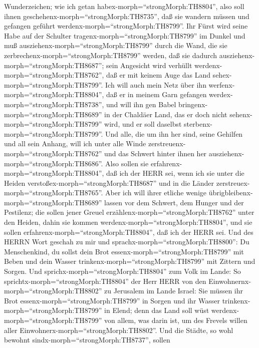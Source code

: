 Wunderzeichen; wie ich getan habex-morph=``strongMorph:TH8804'', also
soll ihnen geschehenx-morph=``strongMorph:TH8735'', daß sie wandern
müssen und gefangen geführt werdenx-morph=``strongMorph:TH8799''.
 Ihr Fürst wird seine Habe auf der Schulter
tragenx-morph=``strongMorph:TH8799'' im Dunkel und muß
ausziehenx-morph=``strongMorph:TH8799'' durch die Wand, die sie
zerbrechenx-morph=``strongMorph:TH8799'' werden, daß sie dadurch
ausziehenx-morph=``strongMorph:TH8687''; sein Angesicht wird verhüllt
werdenx-morph=``strongMorph:TH8762'', daß er mit keinem Auge das Land
sehex-morph=``strongMorph:TH8799''.  Ich will auch mein
Netz über ihn werfenx-morph=``strongMorph:TH8804'', daß er in meinem
Garn gefangen werdex-morph=``strongMorph:TH8738'', und will ihn gen
Babel bringenx-morph=``strongMorph:TH8689'' in der Chaldäer Land, das er
doch nicht sehenx-morph=``strongMorph:TH8799'' wird, und er soll
daselbst sterbenx-morph=``strongMorph:TH8799''.  Und alle,
die um ihn her sind, seine Gehilfen und all sein Anhang, will ich unter
alle Winde zerstreuenx-morph=``strongMorph:TH8762'' und das Schwert
hinter ihnen her ausziehenx-morph=``strongMorph:TH8686''. 
Also sollen sie erfahrenx-morph=``strongMorph:TH8804'', daß ich der HERR
sei, wenn ich sie unter die Heiden
verstoßex-morph=``strongMorph:TH8687'' und in die Länder
zerstreuex-morph=``strongMorph:TH8765''.  Aber ich will
ihrer etliche wenige übrigbleibenx-morph=``strongMorph:TH8689'' lassen
vor dem Schwert, dem Hunger und der Pestilenz; die sollen jener Greuel
erzählenx-morph=``strongMorph:TH8762'' unter den Heiden, dahin sie
kommen werdenx-morph=``strongMorph:TH8804'', und sie sollen
erfahrenx-morph=``strongMorph:TH8804'', daß ich der HERR sei.
 Und des HERRN Wort geschah zu mir und
sprachx-morph=``strongMorph:TH8800'':  Du Menschenkind, du
sollst dein Brot essenx-morph=``strongMorph:TH8799'' mit Beben und dein
Wasser trinkenx-morph=``strongMorph:TH8799'' mit Zittern und Sorgen.
 Und sprichx-morph=``strongMorph:TH8804'' zum Volk im
Lande: So sprichtx-morph=``strongMorph:TH8804'' der Herr HERR von den
Einwohnernx-morph=``strongMorph:TH8802'' zu Jerusalem im Lande Israel:
Sie müssen ihr Brot essenx-morph=``strongMorph:TH8799'' in Sorgen und
ihr Wasser trinkenx-morph=``strongMorph:TH8799'' in Elend; denn das Land
soll wüst werdenx-morph=``strongMorph:TH8799'' von allem, was darin ist,
um des Frevels willen aller Einwohnerx-morph=``strongMorph:TH8802''.
 Und die Städte, so wohl bewohnt
sindx-morph=``strongMorph:TH8737'', sollen
